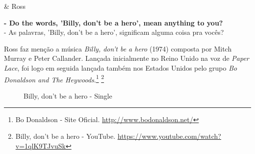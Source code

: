 \begin{tcolorbox}[enhanced,center upper,
    drop fuzzy shadow southeast, boxrule=0.3pt,
    lower separated=false, breakable,
    colframe=black!30!dialogoBorder,colback=white]
\begin{minipage}[c]{0.16\linewidth}
   & \centering \scriptsize{Ross}
\end{minipage}
\hfill
\begin{minipage}[c]{0.8\linewidth}
  \textbf{- Do the words, 'Billy, don't be a hero', mean anything to you?}\\
  - As palavras, 'Billy, don't be a hero', significam alguma coisa pra vocês?
\end{minipage}
\end{tcolorbox}

\saveparinfos
\noindent
\begin{minipage}[c]{0.5\textwidth}\useparinfo

Ross faz menção a música \emph{Billy, don't be a hero} (1974) composta
por Mitch Murray e Peter Callander. Lançada inicialmente no Reino Unido
na voz de \emph{Paper Lace}, foi logo em seguida lançada também nos
Estados Unidos pelo grupo \emph{Bo Donaldson and The
Heywoods}.\footnote{\sloppy Bo Donaldson - Site Oficial. \url{http://www.bodonaldson.net/}}
\footnote{\sloppy Billy, don’t be a hero - YouTube. \url{https://www.youtube.com/watch?v=1qlK9TJvuSk}}

\end{minipage}\hfill
\begin{minipage}[c]{0.5\textwidth}

\begin{figure}
  \centering
    \caption{Billy, don’t be a hero - Single\label{fig:billy-don-t-be-a-hero-single}}
\end{figure}

\end{minipage}

